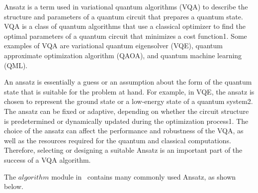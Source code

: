 Ansatz is a term used in variational quantum algorithms (VQA) to describe the structure and parameters of a quantum circuit that prepares a quantum state. VQA is a class of quantum algorithms that use a classical optimizer to find the optimal parameters of a quantum circuit that minimizes a cost function1. Some examples of VQA are variational quantum eigensolver (VQE), quantum approximate optimization algorithm (QAOA), and quantum machine learning (QML).

An ansatz is essentially a guess or an assumption about the form of the quantum state that is suitable for the problem at hand. For example, in VQE, the ansatz is chosen to represent the ground state or a low-energy state of a quantum system2. The ansatz can be fixed or adaptive, depending on whether the circuit structure is predetermined or dynamically updated during the optimization process1. The choice of the ansatz can affect the performance and robustness of the VQA, as well as the resources required for the quantum and classical computations. Therefore, selecting or designing a suitable Ansatz is an important part of the success of a VQA algorithm.

The $algorithm$ module in \MindQuantum \ contains many commonly used Ansatz, as shown below.

